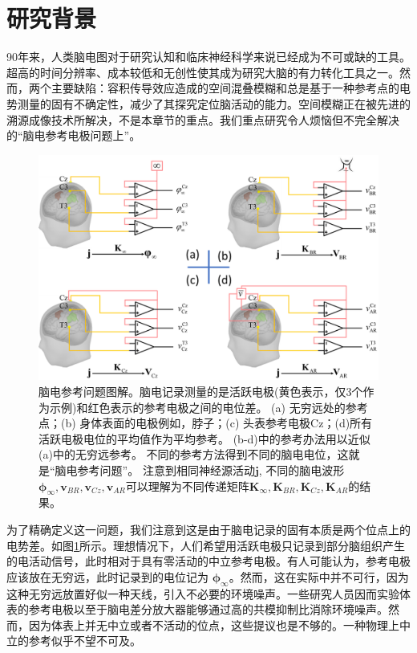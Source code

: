 \section{研究背景}
90年来，人类脑电图对于研究认知和临床神经科学来说已经成为不可或缺的工具。超高的时间分辨率、成本较低和无创性使其成为研究大脑的有力转化工具之一。然而，两个主要缺陷：容积传导效应造成的空间混叠模糊和总是基于一种参考点的电势测量的固有不确定性，减少了其探究定位脑活动的能力。空间模糊正在被先进的溯源成像技术所解决，不是本章节的重点。我们重点研究令人烦恼但不完全解决的“脑电参考电极问题上”。
\begin{figure}[!ht]
	\centering
	\includegraphics[width=15cm]{pic/Frontier/figure1.png}
	\caption{脑电参考问题图解。脑电记录测量的是活跃电极(黄色表示，仅3个作为示例)和红色表示的参考电极之间的电位差。 (a) 无穷远处的参考点；(b) 身体表面的电极例如，脖子；(c) 头表参考电极Cz；(d)所有活跃电极电位的平均值作为平均参考。 (b-d)中的参考办法用以近似(a)中的无穷远参考。 不同的参考方法得到不同的脑电电位，这就是“脑电参考问题”。 注意到相同神经源活动$\mathbf{j}$, 不同的脑电波形$\mathbf{\phi}_\infty,\mathbf{v}_{BR},\mathbf{v}_{Cz},\mathbf{v}_{AR}$可以理解为不同传递矩阵$\mathbf{K}_\infty,\mathbf{K}_{BR},\mathbf{K}_{Cz},\mathbf{K}_{AR}$的结果。}
	\label{3.1}
\end{figure}
为了精确定义这一问题，我们注意到这是由于脑电记录的固有本质是两个位点上的电势差。如图\ref{3.1}所示。理想情况下，人们希望用活跃电极只记录到部分脑组织产生的电活动信号，此时相对于具有零活动的中立参考电极。有人可能认为，参考电极应该放在无穷远，此时记录到的电位记为 $\mathbf{\phi}_{\infty}$。然而，这在实际中并不可行，因为这种无穷远放置好似一种天线，引入不必要的环境噪声。一些研究人员因而实验体表的参考电极以至于脑电差分放大器能够通过高的共模抑制比消除环境噪声。然而，因为体表上并无中立或者不活动的位点，这些提议也是不够的。一种物理上中立的参考似乎不望不可及。

